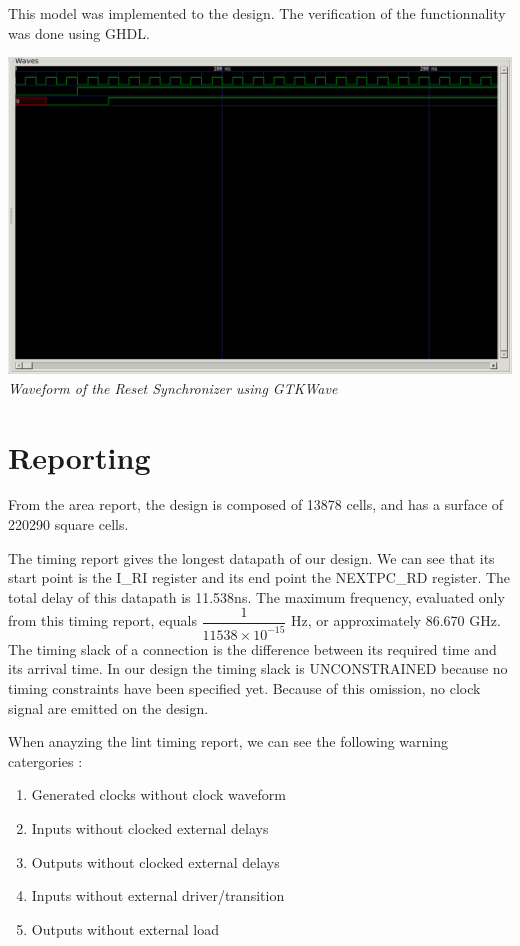 \documentclass[a4paper]{article}
\begin{document}
This model was implemented to the design. The verification of the functionnality was done using GHDL.
\begin{center}
  \includegraphics[width=15cm]{./reset_sync_waveform.png}\\
  {\it Waveform of the Reset Synchronizer using GTKWave}
\end{center}



\newpage

\section{Reporting}
From the area report, the design is composed of 13878 cells, and has a surface of 220290 square cells.

The timing report gives the longest datapath of our design. We can see that its start point is the I\_RI register
and its end point the NEXTPC\_RD register. The total delay of this datapath is 11.538ns.
The maximum frequency, evaluated only from this timing report, equals $\dfrac{1}{11538\times10^{-15}}$ Hz, or
approximately 86.670 GHz.
The timing slack of a connection is the difference between its required time and its arrival time. In our design
the timing slack is UNCONSTRAINED because no timing constraints have been specified yet. Because of this omission,
no clock signal are emitted on the design.

When anayzing the lint timing report, we can see the following warning catergories :
\begin{enumerate}
  \item Generated clocks without clock waveform
  \item Inputs without clocked external delays
  \item Outputs without clocked external delays
  \item Inputs without external driver/transition
  \item Outputs without external load
\end{enumerate}
\end{document}
